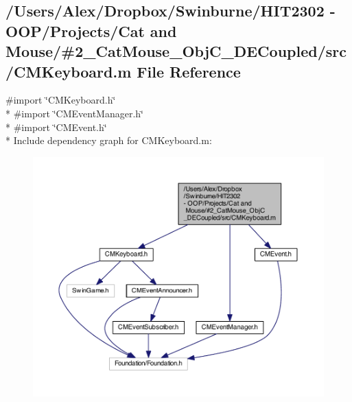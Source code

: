 \subsection{/\-Users/\-Alex/\-Dropbox/\-Swinburne/\-H\-I\-T2302 -\/ O\-O\-P/\-Projects/\-Cat and Mouse/\#2\-\_\-\-Cat\-Mouse\-\_\-\-Obj\-C\-\_\-\-D\-E\-Coupled/src/\-C\-M\-Keyboard.m File Reference}
\label{_c_m_keyboard_8m}
{\ttfamily \#import \char`\"{}C\-M\-Keyboard.\-h\char`\"{}}\\*
{\ttfamily \#import \char`\"{}C\-M\-Event\-Manager.\-h\char`\"{}}\\*
{\ttfamily \#import \char`\"{}C\-M\-Event.\-h\char`\"{}}\\*
Include dependency graph for C\-M\-Keyboard.\-m\-:
\nopagebreak
\begin{figure}[H]
\begin{center}
\leavevmode
\includegraphics[width=350pt]{_c_m_keyboard_8m__incl}
\end{center}
\end{figure}

